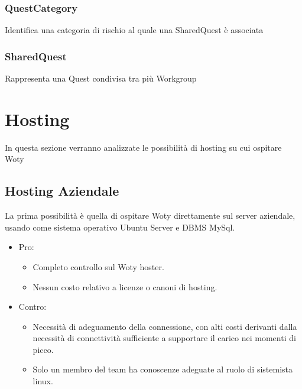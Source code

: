 \subsubsection{QuestCategory}Identifica una categoria di rischio al quale una SharedQuest è associata
\subsubsection{SharedQuest}Rappresenta una Quest condivisa tra più Workgroup

\section{Hosting}
In questa sezione verranno analizzate le possibilità di hosting su cui ospitare Woty
\subsection{Hosting Aziendale}
La prima possibilità è quella di ospitare Woty direttamente sul server aziendale, usando come sistema operativo Ubuntu Server e DBMS MySql.
\\
\begin{itemize}
\item Pro:
\begin{itemize}
\item Completo controllo sul Woty hoster.
\item Nessun costo relativo a licenze o canoni di hosting.
\end{itemize}
\item Contro:
\begin{itemize}
\item Necessità di adeguamento della connessione, con alti costi derivanti dalla necessità di connettività sufficiente a supportare il carico nei momenti di picco.
\item Solo un membro del team ha conoscenze adeguate al ruolo di sistemista linux.
\end{itemize}
\end{itemize}

